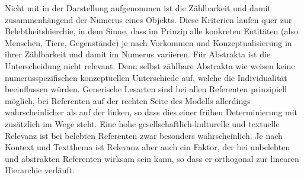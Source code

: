 Nicht mit in der Darstellung aufgenommen ist die Zählbarkeit und damit zusammenhängend der Numerus eines Objekts. Diese Kriterien laufen quer zur Belebtheitshierchie, in dem Sinne, dass im Prinzip alle konkreten Entitäten (also Menschen, Tiere, Gegenstände) je nach Vorkommen und Konzeptualisierung in ihrer Zählbarkeit und damit im Numerus variieren. Für Abstrakta ist die Unterscheidung nicht relevant. Denn selbst zählbare Abstrakta wie  weisen keine numerusspezifischen konzeptuellen Unterschiede auf, welche die Individualität beeinflussen würden. Generische Lesarten sind bei allen Referenten prinzipiell möglich, bei Referenten auf der rechten Seite des Modells allerdings wahrscheinlicher als auf der linken, so dass dies einer frühen Determinierung mit  zusätzlich im Wege steht. Eine hohe gesellschaftlich-kulturelle und textuelle Relevanz ist bei belebten Referenten zwar besonders wahrscheinlich. Je nach Kontext und Textthema ist Relevanz aber auch ein Faktor, der bei unbelebten und abstrakten Referenten wirksam sein kann, so dass er orthogonal zur linearen Hierarchie verläuft. 
